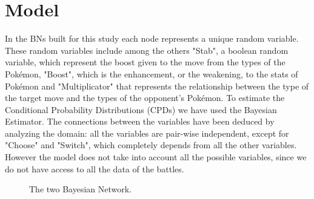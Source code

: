 \documentclass[letterpaper]{article}
\begin{document}

\section{Model}
In the BNs built for this study each node represents a unique random variable. These random variables include among the others "Stab", a boolean random variable, which represent the boost given to the move from the types of the Pokémon, "Boost", which is the enhancement, or the weakening, to the stats of Pokémon and "Multiplicator" that represents the relationship between the type of the target move and the types of the opponent's Pokémon.
To estimate the Conditional Probability Distributions (CPDs) we have used the Bayesian Estimator.
The connections between the variables have been deduced by analyzing the domain: all the variables are pair-wise independent, except for "Choose" and "Switch", which completely depends from all the other variables.
However the model does not take into account all the possible variables, since we do not have access to all the data of the battles.
\begin{figure}[!ht]
  \centering
  
   \caption{The two Bayesian Network.}
  \label{fig:sub1}
\end{figure}
\end{document}
